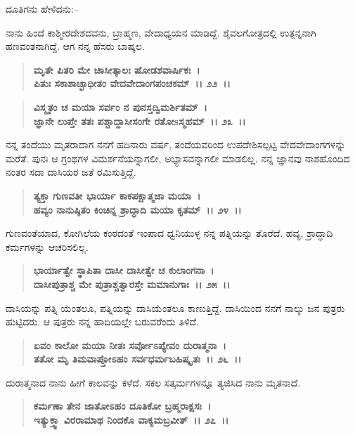 \begin{flushleft}
ದೂತಿಗನು ಹೇಳಿದನು:–
\end{flushleft}

ನಾನು ಹಿಂದೆ ಕಾಶ್ಮೀರದೇಶದವನು, ಬ್ರಾಹ್ಮಣ, ವೇದಾಧ್ಯಯನ ಮಾಡಿದ್ದೆ. ಶೈವಲಗೋತ್ರದಲ್ಲಿ ಉತ್ಪನ್ನನಾಗಿ ಹಣವಂತನಾಗಿದ್ದೆ. ಆಗ ನನ್ನ ಹೆಸರು ಬಾಷ್ಕಲ.

\begin{verse}
\textbf{ಮೃತೇ ಪಿತರಿ ಮೇ ಚಾಸೀತ್ಕಾಲಃ ಷೋಡಶವಾರ್ಷಿಕಃ~।}\\\textbf{ಪಿತುಃ ಸಕಾಶಾಚ್ಛಾಧೀತಂ ವೇದವೇದಾಂಗಪಂಚಕಮ್~।। ೨೨~।। }
\end{verse}

\begin{verse}
\textbf{ವಿಸ್ಮೃತಂ ಚ ಮಯಾ ಸರ್ವಂ ನ ಪುನಸ್ತದ್ವಿಮರ್ಶಿತಮ್~।}\\\textbf{ಜ್ಞಾನೇ ಲುಪ್ತೇ ತತಃ ಪಶ್ಚಾದ್ದಾಸೀಸಂಗೇ ರತೋsಸ್ಮಹಮ್~।। ೨೩~।।}
\end{verse}

ನನ್ನ ತಂದೆಯು ಮೃತರಾದಾಗ ನನಗೆ ಹದಿನಾರು ವರ್ಷ, ತಂದೆಯವರಿಂದ ಉಪದೇಶಿಸಲ್ಪಟ್ಟ ವೇದವೇದಾಂಗಗಳನ್ನು ಮರೆತೆ. ಪುನಃ ಆ ಗ್ರಂಥಗಳ ವಿಮರ್ಶನೆಯನ್ನಾಗಲೀ, ಅಭ್ಯಾಸವನ್ನಾಗಲೀ ಮಾಡಲಿಲ್ಲ. ನನ್ನ ಜ್ಞಾನವು ನಾಶಹೊಂದಿದ ನಂತರ ಸದಾ ದಾಸಿಯರ ಜತೆ ರಮಿಸುತ್ತಿದ್ದೆ.

\begin{verse}
\textbf{ತ್ಯಕ್ತಾ ಗುಣವತೀ ಭಾರ್ಯಾ ಕಾಕಪಕ್ಷಾತ್ಮಜಾ ಮಯಾ~।}\\\textbf{ಹವ್ಯಂ ನಾನುಷ್ಠಿತಂ ಕಿಂಚಿನ್ನ ಶ್ರಾದ್ಧಾದಿ ಮಯಾ ಕೃತಮ್~।। ೨೪~।।}
\end{verse}

ಗುಣವಂತೆಯಾದ, ಕೋಗಿಲೆಯ ಕಂಠದಂತೆ ಇಂಪಾದ ಧ್ವನಿಯುಳ್ಳ ನನ್ನ ಪತ್ನಿಯನ್ನು ತೊರೆದೆ. ಹವ್ಯ, ಶ್ರಾದ್ಧಾದಿ ಕರ್ಮಗಳನ್ನು ಆಚರಿಸಲಿಲ್ಲ.

\begin{verse}
\textbf{ಭಾರ್ಯಾತ್ವೇ ಸ್ಥಾಪಿತಾ ದಾಸೀ ದಾಸೀತ್ವೇ ಚ ಕುಲಾಂಗನಾ~।}\\\textbf{ದಾಸೀಪುತ್ರಾಶ್ಚ ಮೇ ಪುತ್ರಾಶ್ಚತ್ವಾರಸ್ತೇ ಮಮಾನುಗಾಃ~।। ೨೫~।।}
\end{verse}

ದಾಸಿಯನ್ನು ಪತ್ನಿ ಯೆಂತಲೂ, ಪತ್ನಿಯನ್ನು ದಾಸಿಯೆಂತಲೂ ಕಾಣುತ್ತಿದ್ದೆ. ದಾಸಿಯಿಂದ ನನಗೆ ನಾಲ್ಕು ಜನ ಪುತ್ರರು ಹುಟ್ಟಿದರು. ಆ ಪುತ್ರರು ನನ್ನ ಹಾದಿಯಲ್ಲೇ ಬರುವರೆಂದು ತಿಳಿದೆ.

\begin{verse}
\textbf{ಏವಂ ಕಾಲೋ ಮಯಾ ನೀತಃ ಸರ್ವೋಽಪ್ಯೇವಂ ದುರಾತ್ಮನಾ~।}\\\textbf{ತತೋ ಮೃ ತಿಮವಾಪ್ತೋಽಹಂ ಸರ್ವಧರ್ಮಬಹಿಷ್ಕೃತಃ~।। ೨೬~।।}
\end{verse}

ದುರಾತ್ಮನಾದ ನಾನು ಹೀಗೆ ಕಾಲವನ್ನು ಕಳೆದೆ. ಸಕಲ ಸತ್ಕರ್ಮಗಳನ್ನೂ ತ್ಯಜಿಸಿದ ನಾನು ಮೃತನಾದೆ.

\begin{verse}
\textbf{ಕರ್ಮಣಾ ತೇನ ಜಾತೋಽಹಂ ದೂತಿಕೋ ಬ್ರಹ್ಮರಾಕ್ಷಸಃ~।}\\\textbf{ಇತ್ಯುಕ್ತ್ವಾ ವಿರರಾಮಾಥ ನಿಂದಕೊ ವಾಕ್ಯಮಬ್ರವೀತ್~।। ೨೭~।।}
\end{verse}

